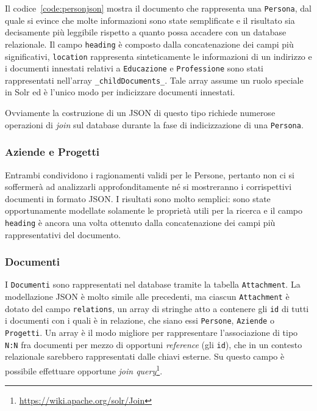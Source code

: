 \vspace{-0.5em}
Il codice~\ref{code:personjson} mostra il documento che rappresenta una \texttt{Persona}, dal quale si evince che molte informazioni sono state semplificate e il risultato sia decisamente più leggibile rispetto a quanto possa accadere con un database relazionale. Il campo \texttt{heading} è composto dalla concatenazione dei campi più significativi, \texttt{location} rappresenta sinteticamente le informazioni di un indirizzo e i documenti innestati relativi a \texttt{Educazione} e \texttt{Professione} sono stati rappresentati nell’array \texttt{\_childDocuments\_}. Tale array assume un ruolo speciale in Solr ed è l’unico modo per indicizzare documenti innestati.

\vspace{1em}
Ovviamente la costruzione di un JSON di questo tipo richiede numerose operazioni di \textit{join} sul database durante la fase di indicizzazione di una \texttt{Persona}.


\subsubsection{Aziende e Progetti}

Entrambi condividono i ragionamenti validi per le \texttt{}{Persone}, pertanto non ci si soffermerà ad analizzarli approfonditamente né si mostreranno i corrispettivi documenti in formato JSON. I risultati sono molto semplici: sono state opportunamente modellate solamente le proprietà utili per la ricerca e il campo \texttt{heading} è ancora una volta ottenuto dalla concatenazione dei campi più rappresentativi del documento.


\subsubsection{Documenti}

I \texttt{Documenti} sono rappresentati nel database tramite la tabella \texttt{Attachment}. La modellazione JSON è molto simile alle precedenti, ma ciascun \texttt{Attachment} è dotato del campo \texttt{relations}, un array di stringhe atto a contenere gli \texttt{id} di tutti i documenti con i quali è in relazione, che siano essi \texttt{Persone}, \texttt{Aziende} o \texttt{Progetti}. Un array è il modo migliore per rappresentare l’associazione di tipo \texttt{N:N} fra documenti per mezzo di opportuni \textit{reference} (gli \texttt{id}), che in un contesto relazionale sarebbero rappresentati dalle chiavi esterne. Su questo campo è possibile effettuare opportune \textit{join query}\footnote{\url{https://wiki.apache.org/solr/Join}}.

